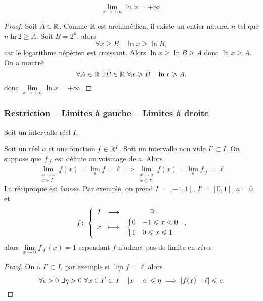 \begin{theo}
  \begin{equation}
    \lim\limits_{x \to +\infty} \ln x = + \infty.
  \end{equation}
\end{theo}
\begin{proof}
  Soit $A \in \mathbb{R}$. Comme $\mathbb{R}$ est archimédien, il existe un entier naturel $n$ tel que $n \ln 2 \geqslant A$. Soit $B=2^n$, alors
  \begin{equation}
    \forall x \geqslant B \quad \ln x \geqslant \ln B,
  \end{equation}
  car le logarithme népérien est croissant. Alors $\ln x \geqslant \ln B \geqslant A$ donc $\ln x \geqslant A$. On a montré
\begin{equation}
  \forall A \in \mathbb{R} \ \exists B \in \mathbb{R} \ \forall x \geqslant B \quad \ln x \geqslant A,
\end{equation}
donc $\lim\limits_{x \to +\infty} \ln x = + \infty$.
\end{proof}

\subsubsection{Restriction -- Limites à gauche -- Limites à droite}
Soit un intervalle réel $I$.
\begin{prop}
  Soit un réel $a$ et une fonction $f \in \mathbb{R}^I$. Soit un intervalle non vide $I' \subset I$. On suppose que $f_{|I^{'}}$ est définie au voisinage de $a$. Alors
  \begin{equation}
    \lim\limits_{\begin{array}{l} x \to a \\ x \in I\end{array}}f(x)=\lim\limits_{a}f=\ell \implies \lim\limits_{\begin{array}{l} x \to a \\ x \in I'\end{array}}f(x)=\lim\limits_{a}f_{|I^{'}}=\ell
  \end{equation}
La réciproque est fausse. Par exemple, on prend $I=[-1,1]$, $I'=[0,1]$, $a=0$ et
\begin{equation}
  f\colon \left\{\begin{array}{ccc} I & \longrightarrow &\mathbb{R}\\ x & \longmapsto & \begin{cases} 0 & -1 \leqslant x < 0 \\ 1 & 0 \leqslant x \leqslant 1\end{cases} \end{array} \right.,
\end{equation}
alors $\lim\limits_{x \to 0}f_{|I^{'}}(x)=1$ cependant $f$ n'admet pas de limite en zéro.
\end{prop}
\begin{proof}
  On a $ I' \subset I$, par exemple si $\lim\limits_{a} f =\ell$ alors
  \begin{equation}
    \forall \epsilon > 0 \ \exists \eta > 0 \ \forall x \in I' \subset I \quad \left\lvert x-a\right\rvert \leqslant \eta \implies \left\lvert f(x) - \ell\right\rvert \leqslant \epsilon.
  \end{equation}
\end{proof}

